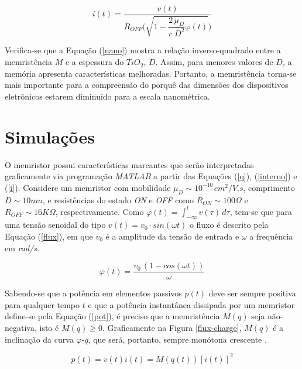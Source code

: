 \documentclass{ceel}
\begin{document}
\begin{multicols}{2}
\begin{equation}\label{i}
i(t)=\dfrac{v(t)}{R_{OFF}\Bigg(\sqrt{1-\dfrac{2\, \mu_D}{r\; D^2}\varphi(t) }\Bigg)}
\end{equation} 
\vspace{0.05cm}

Verifica-se que a Equação (\ref{nano}) mostra a relação inverso-quadrado entre a memristência $M$ e a espessura do $TiO_2$, $D$. Assim, para menores valores de $D$, a memória apresenta características melhoradas. Portanto, a memristência torna-se mais importante para a compreensão do porquê das dimensões dos dispositivos eletrônicos estarem diminuido para a escala nanométrica.

\section{Simulações} \label{sim}
O memristor possui características marcantes que serão interpretadas graficamente via programação \emph{MATLAB} a partir das Equações (\ref{q}), (\ref{interno}) e (\ref{i}). Considere um memristor com mobilidade $\mu_D \sim 10^{-10\,} cm^2/V.s$, comprimento $D\sim10nm$, e resistências do estado \textit{ON} e \textit{OFF} como $R_{ON}\sim 100\Omega$ e $R_{OFF}\sim 16K\Omega$, respectivamente. Como $\varphi(t)=\int_{-\infty}^t v(\tau)\, d\tau$, tem-se que para uma tensão senoidal do tipo $v(t)=v_0\cdot sin(\omega t)$ o fluxo é descrito pela Equação (\ref{flux}), em que $v_0$ é a amplitude da tensão de entrada e $\omega $ a frequência em \textit{rad/s}.

\begin{equation}\label{flux}
\varphi(t) = \dfrac{v_0\, (1-cos(\omega t))}{\omega}
\end{equation}

Sabendo-se que a potência em elementos passivos $p(t)$ deve ser sempre positiva para qualquer tempo $t$ e que a potência instantânea dissipada por um memristor define-se pela Equação (\ref{pot}), é preciso que a memristência $M(q)$ seja não-negativa, isto é $M(q)\geq 0$. Graficamente na Figura \ref{flux-charge}, $M(q)$ é a inclinação da curva $\varphi$-$q$, que será, portanto, sempre monótona crescente \cite{artigo}.

\begin{equation}\label{pot}
p(t) = v(t)i(t)=M(q(t))[i(t)]^2
\end{equation}


\end{multicols}
\end{document}
